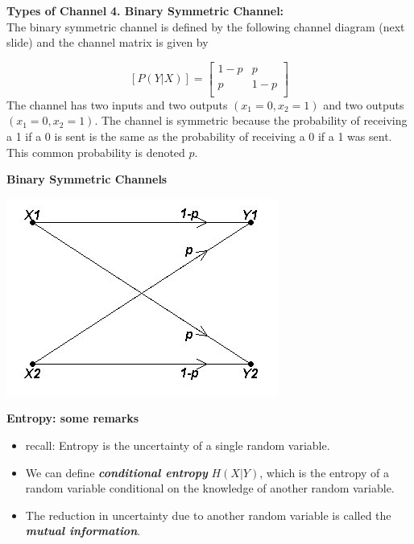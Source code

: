 \documentclass[a4]{beamer}
\begin{document}

\noindent \textbf{Types of Channel}
\textbf{4. Binary Symmetric Channel:}\\
The binary symmetric channel is defined by the following channel diagram (next slide) and the channel matrix is given by

\[  [P(Y|X)]  = \left[ \begin{array}{cc}
1-p & p  \\
p & 1-p\\
\end{array} \right] \]
The channel has two inputs and two outputs $(x_1=0,x_2=1)$ and two outputs $(x_1=0,x_2=1)$. The channel is symmetric because the probability of receiving a 1 if a 0 is sent is the same as the probability of receiving a 0 if a 1 was sent. This common probability is denoted $p$.


{
\noindent \textbf{Binary Symmetric Channels}

\begin{center}
\includegraphics[scale=0.54]{11aBSC}
\end{center}
}



{
\noindent \textbf{Entropy: some remarks}
\begin{itemize}
\item recall: Entropy is the uncertainty of a single random variable. \item We can define \textbf{\emph{conditional entropy }}$H(X|Y)$, which is the entropy of a random variable
conditional on the knowledge of another random variable. \item The reduction in uncertainty due to another random variable is called the \textbf{\emph{mutual information}}.
\end{itemize}
}
\end{document}
